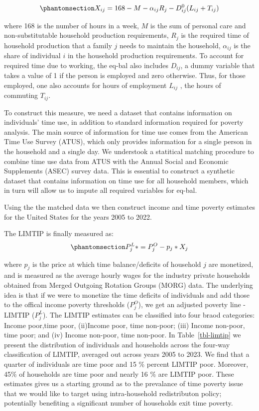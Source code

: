 \documentclass[
  11pt,
]{article}
\begin{document}
\begin{equation}\phantomsection\label{eq-bal}{X_{ij} = 168 - M - \alpha_{ij}R_j-D_{ij}^0(L_{ij}+T_{ij})
}\end{equation}

where 168 is the number of hours in a week, \(M\) is the sum of personal
care and non-substitutable household production requirements, \(R_j\) is
the required time of household production that a family \(j\) needs to
maintain the household, \(\alpha_{ij}\) is the share of individual \(i\)
in the household production requirements. To account for required time
due to working, the eq-bal also includes \(D_{ij}\), a dummy variable
that takes a value of 1 if the person is employed and zero otherwise.
Thus, for those employed, one also accounts for hours of employment
\(L_{ij}\) , the hours of commuting \(T_{ij}\).

To construct this measure, we need a dataset that contains information
on individuals' time use, in addition to standard information required
for poverty analysis. The main source of information for time use comes
from the American Time Use Survey (ATUS), which only provides
information for a single person in the household and a single day. We
understook a statitical matching procedure to combine time use data from
ATUS with the Annual Social and Economic Supplements (ASEC) survey data.
This is essential to construct a synthetic dataset that contains
information on time use for all household members, which in turn will
allow us to impute all required variables for eq-bal.

Using the the matched data we then construct income and time poverty
estimates for the United States for the years 2005 to 2022.

The LIMTIP is finally measured as:
\begin{equation}\phantomsection\label{eq-limtip}{P_{j}^L* = P_{j}^O- p_{j}*X_{j}
}\end{equation}

where \(p_{j}\) is the price at which time balance/deficits of household
\({j}\) are monetized, and is measured as the average hourly wages for
the industry private households obtained from Merged Outgoing Rotation
Groups (MORG) data. The underlying idea is that if we were to monetize
the time deficits of individuals and add those to the offical income
poverty thresholds (\(P_{j}^O\)), we get an adjusted poverty line -
LIMTIP (\(P_{j}^L\)). The LIMTIP estimates can be classified into four
braod categories: Income poor,time poor, (ii)Income poor, time non-poor;
(iii) Income non-poor, time poor; and (iv) Income non-poor, time
non-poor. In Table~\ref{tbl-limtip} we present the distribution of
individuals and households across the four-way classification of LIMTIP,
averaged out across years 2005 to 2023. We find that a quarter of
individuals are time poor and 15 \% percent LIMTIP poor. Moreover, 45\%
of households are time poor and nearly 16 \% are LIMTIP poor. These
estimates gives us a starting ground as to the prevalance of time
poverty issue that we would like to target using intra-household
redistributon policy; potentially benefiting a significant number of
households exit time poverty.
\end{document}

